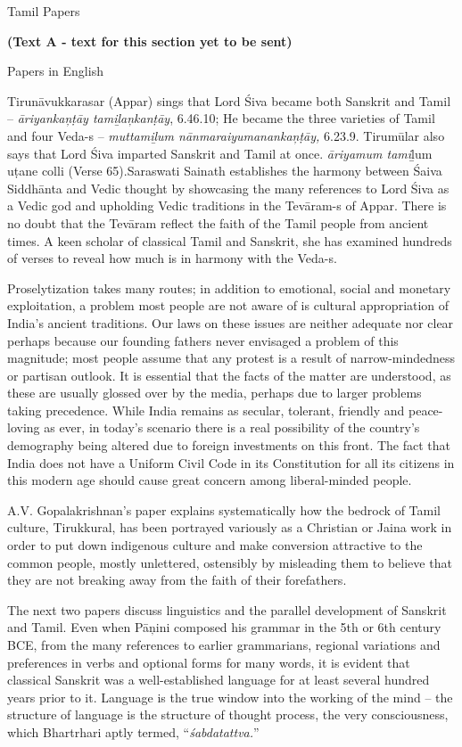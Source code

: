Tamil Papers

\textbf{(Text A - text for this section yet to be sent)}

Papers in English

Tirunāvukkarasar (Appar) sings that Lord Śiva became both Sanskrit and Tamil – \textit{āriyankaņṭāy tamiḻaņkanṭāy}, 6.46.10; He became the three varieties of Tamil and four Veda-s -- \textit{muttamiḻum nānmaraiyumanankaņ\break ṭāy,} 6.23.9. Tirumūlar also says that Lord Śiva imparted Sanskrit and Tamil at once. \textit{āriyamum tami}ḻum uṭane colli (Verse 65).Saraswati Sainath establishes the harmony between Śaiva Siddhānta and Vedic thought by showcasing the many references to Lord Śiva as a Vedic god and upholding Vedic traditions in the Tevāram-s of Appar. There is no doubt that the Tevāram reflect the faith of the Tamil people from ancient times. A keen scholar of classical Tamil and Sanskrit, she has examined hundreds of verses to reveal how much is in harmony with the Veda-s.

Proselytization takes many routes; in addition to emotional, social and monetary exploitation, a problem most people are not aware of is cultural appropriation of India’s ancient traditions. Our laws on these issues are neither adequate nor clear perhaps because our founding fathers never envisaged a problem of this magnitude; most people assume that any protest is a result of narrow-mindedness or partisan outlook. It is essential that the facts of the matter are understood, as these are usually glossed over by the media, perhaps due to larger problems taking precedence. While India remains as secular, tolerant, friendly and peace-loving as ever, in today’s scenario there is a real possibility of the country’s demography being altered due to foreign investments on this front. The fact that India does not have a Uniform Civil Code in its Constitution for all its citizens in this modern age should cause great concern among liberal-minded people.

A.V. Gopalakrishnan’s paper explains systematically how the bedrock of Tamil culture, Tirukkural, has been portrayed variously as a Christian or Jaina work in order to put down indigenous culture and make conversion attractive to the common people, mostly unlettered, ostensibly by misleading them to believe that they are not breaking away from the faith of their forefathers.

The next two papers discuss linguistics and the parallel development of Sanskrit and Tamil. Even when Pāņini composed his grammar in the 5th or 6th century BCE, from the many references to earlier grammarians, regional variations and preferences in verbs and optional forms for many words, it is evident that classical Sanskrit was a well-established language for at least several hundred years prior to it. Language is the true window into the working of the mind – the structure of language is the structure of thought process, the very consciousness, which Bhartrhari aptly termed, “\textit{śabdatattva.}”

